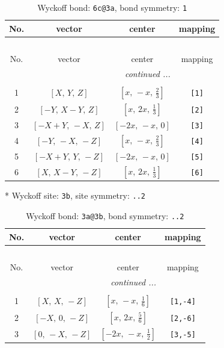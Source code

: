 \documentclass[fleqn,8pt]{jsarticle}
\begin{document}
\renewcommand{\arraystretch}{1.2}
\begin{longtable}{cccc}
\caption{Wyckoff bond: {\tt 6c@3a}, bond symmetry: {\tt 1}}
 \\
 \hline \hline
No. & vector & center & mapping \\ \hline \endfirsthead

\multicolumn{3}{l}{\tablename\ \thetable{}} \\
 \hline \hline
No. & vector & center & mapping \\ \hline \endhead

 \hline \hline
\multicolumn{3}{r}{\footnotesize\it continued ...} \\ \endfoot

 \hline \hline
\multicolumn{3}{r}{} \\ \endlastfoot

1 & $\left[ X,\, Y,\, Z \right]$ & $\left[ x,\, - x,\, \frac{2}{3} \right]$ & {\tt [1]} \\ \hline
2 & $\left[ - Y,\, X - Y,\, Z \right]$ & $\left[ x,\, 2 x,\, \frac{1}{3} \right]$ & {\tt [2]} \\ \hline
3 & $\left[ - X + Y,\, - X,\, Z \right]$ & $\left[ - 2 x,\, - x,\, 0 \right]$ & {\tt [3]} \\ \hline
4 & $\left[ - Y,\, - X,\, - Z \right]$ & $\left[ x,\, - x,\, \frac{2}{3} \right]$ & {\tt [4]} \\ \hline
5 & $\left[ - X + Y,\, Y,\, - Z \right]$ & $\left[ - 2 x,\, - x,\, 0 \right]$ & {\tt [5]} \\ \hline
6 & $\left[ X,\, X - Y,\, - Z \right]$ & $\left[ x,\, 2 x,\, \frac{1}{3} \right]$ & {\tt [6]} \\
\end{longtable}
* Wyckoff site: {\tt 3b}, site symmetry: {\tt ..2}
\renewcommand{\arraystretch}{1.2}
\begin{longtable}{cccc}
\caption{Wyckoff bond: {\tt 3a@3b}, bond symmetry: {\tt ..2}}
 \\
 \hline \hline
No. & vector & center & mapping \\ \hline \endfirsthead

\multicolumn{3}{l}{\tablename\ \thetable{}} \\
 \hline \hline
No. & vector & center & mapping \\ \hline \endhead

 \hline \hline
\multicolumn{3}{r}{\footnotesize\it continued ...} \\ \endfoot

 \hline \hline
\multicolumn{3}{r}{} \\ \endlastfoot

1 & $\left[ X,\, X,\, - Z \right]$ & $\left[ x,\, - x,\, \frac{1}{6} \right]$ & {\tt [1,-4]} \\ \hline
2 & $\left[ - X,\, 0,\, - Z \right]$ & $\left[ x,\, 2 x,\, \frac{5}{6} \right]$ & {\tt [2,-6]} \\ \hline
3 & $\left[ 0,\, - X,\, - Z \right]$ & $\left[ - 2 x,\, - x,\, \frac{1}{2} \right]$ & {\tt [3,-5]} \\
\end{longtable}
\end{document}
